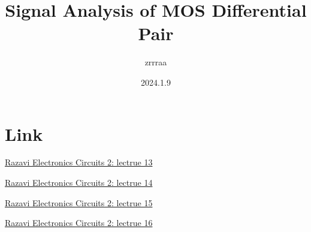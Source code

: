 \documentclass[fontset=windows]{article}
\title{\heiti\zihao{2} Signal Analysis of MOS Differential Pair}
\author{\songti zrrraa}
\date{2024.1.9}
\begin{document}
\maketitle
\thispagestyle{empty}



\section*{Link}

\href{https://www.bilibili.com/video/BV1Ef4y167SN?p=13&vd_source=1d0c07486a3bd3b0adb8ac548bf6453e}{Razavi Electronics Circuits 2: lectrue 13}

\href{https://www.bilibili.com/video/BV1Ef4y167SN?p=14&vd_source=1d0c07486a3bd3b0adb8ac548bf6453e}{Razavi Electronics Circuits 2: lectrue 14}

\href{https://www.bilibili.com/video/BV1Ef4y167SN?p=15&vd_source=1d0c07486a3bd3b0adb8ac548bf6453e}{Razavi Electronics Circuits 2: lectrue 15}

\href{https://www.bilibili.com/video/BV1Ef4y167SN?p=16&vd_source=1d0c07486a3bd3b0adb8ac548bf6453e}{Razavi Electronics Circuits 2: lectrue 16}
\end{document}
